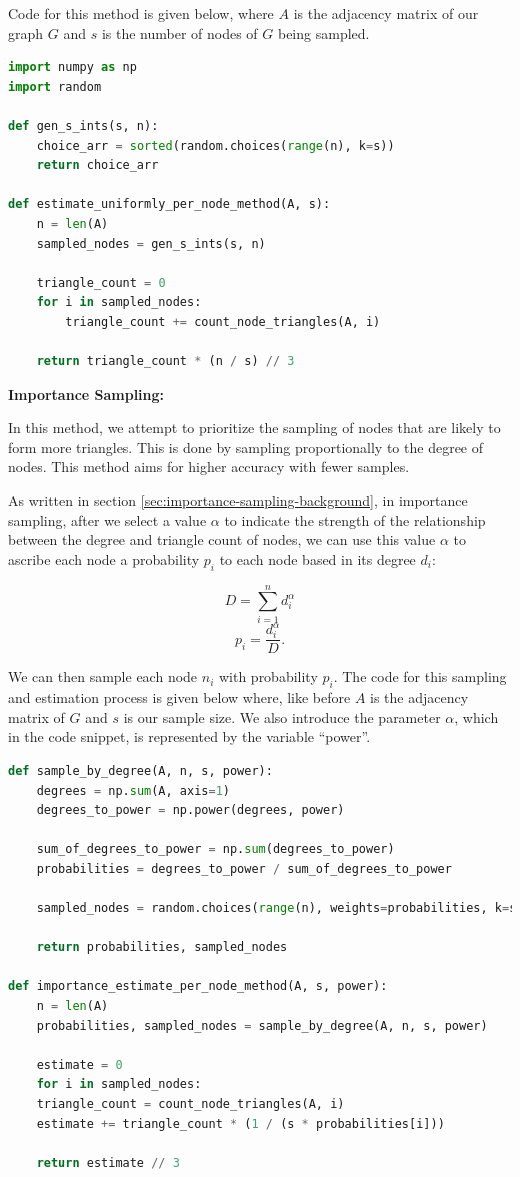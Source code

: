 \documentclass[11pt]{article}
\begin{document}
Code for this method is given below, where $A$ is the adjacency matrix of our graph $G$ and $s$ is the number of nodes of $G$ being sampled.

\begin{lstlisting}[language=Python]
import numpy as np
import random

def gen_s_ints(s, n):
    choice_arr = sorted(random.choices(range(n), k=s))
    return choice_arr

def estimate_uniformly_per_node_method(A, s):
    n = len(A)
    sampled_nodes = gen_s_ints(s, n)

    triangle_count = 0
    for i in sampled_nodes:
        triangle_count += count_node_triangles(A, i)

    return triangle_count * (n / s) // 3

\end{lstlisting}

\textbf{Importance Sampling:}

In this method, we attempt to prioritize the sampling of nodes that are likely to form more triangles.
This is done by sampling proportionally to the degree of nodes.
This method aims for higher accuracy with fewer samples.


As written in section \ref{sec:importance-sampling-background}, in importance sampling, after we select a value $\alpha$ to indicate the strength of the relationship between the degree and triangle count of nodes, we can use this value $\alpha$ to ascribe each node a probability $p_i$ to each node based in its degree $d_i$:

\[
D = \sum_{i = 1}^{n} d_i^\alpha
\]
\[
p_i = \frac{d_i^\alpha}{D}.
\]

We can then sample each node $n_i$ with probability $p_i$.
The code for this sampling and estimation process is given below where, like before $A$ is the adjacency matrix of $G$ and $s$ is our sample size.
We also introduce the parameter $\alpha$, which in the code snippet, is represented by the variable ``power''.

\begin{lstlisting}[language=Python]
def sample_by_degree(A, n, s, power):
    degrees = np.sum(A, axis=1)
    degrees_to_power = np.power(degrees, power)

    sum_of_degrees_to_power = np.sum(degrees_to_power)
    probabilities = degrees_to_power / sum_of_degrees_to_power

    sampled_nodes = random.choices(range(n), weights=probabilities, k=s)

    return probabilities, sampled_nodes

def importance_estimate_per_node_method(A, s, power):
    n = len(A)
    probabilities, sampled_nodes = sample_by_degree(A, n, s, power)

    estimate = 0
    for i in sampled_nodes:
    triangle_count = count_node_triangles(A, i)
    estimate += triangle_count * (1 / (s * probabilities[i]))

    return estimate // 3
\end{lstlisting}
\end{document}
